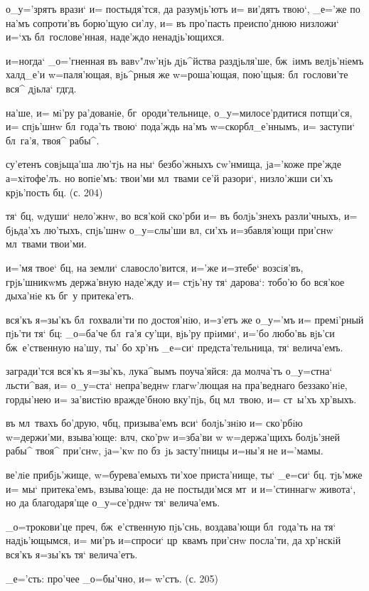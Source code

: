    о_у='зрятъ врази` и= постыдя'тся, да 
разумjь'ютъ и= ви'дятъ твою`, _е='же по на'мъ сопроти'въ 
борю'щую си'лу, и= въ про'пасть преиспо'днюю низложи` 
и=`хъ бл~гослове'нная, наде'ждо ненадjь'ющихся.


  и=ногда` _о='гненная въ 
вавv"лw'нjь дjь^йства раздjьля'ше, бж~iимъ велjь'нiемъ 
халд_е'и w=паля'ющая, вjь^рныя же w=роша'ющая, пою'щыя: 
бл~гослови'те вся^ дjьла` гд гд.

 на'ше, и= мi'ру ра'дованiе, 
бг~ороди'тельнице, о_у=милосе'рдитися потщи'ся, и= 
спjь'шнw бл~года'ть твою` пода'ждь на'мъ 
w=скорбл_е'ннымъ, и= заступи` бл~га'я, твоя^ рабы^.

 су'етенъ совjьща'ша лю'тjь на ны` 
безбо'жныхъ сw'нмища, jа='коже пре'жде а=хiтофе'лъ. но 
вопiе'мъ: твои'ми мл~твами се'й разори`, низло'жши си'хъ 
крjь'пость бц. (с. 204)

  тя` бц, w\т души` 
нело'жнw, во вся'кой ско'рби и= въ болjь'знехъ 
разли'чныхъ, и= бjьда'хъ лю'тыхъ, спjь'шнw о_у=слы'ши 
вл, си'хъ и=збавля'ющи при'снw мл~твами твои'ми.

   и='мя твое` бц, на земли` 
славосло'вится, и='же и=з\ъ тебе` возсiя'въ, грjь'шникwмъ 
держа'вную наде'жду и= стjь'ну тя` дарова`: тобо'ю бо 
вся'кое дыха'нiе къ бг~у притека'етъ.


  вся'къ я=зы'къ 
бл~гохвали'ти по достоя'нiю, и=з'етъ же о_у='мъ 
и= премi'рный пjь'ти тя` бц: _о=ба'че бл~га'я су'щи, 
вjь'ру прiими`, и='бо любо'вь вjь'си бж~е'ственную на'шу, 
ты' бо хр'нъ _е=си` предста'тельница, тя` 
велича'емъ.

 загради'тся вся'къ я=зы'къ, лука^вымъ 
поуча'яйся: да молча'тъ о_у=стна` льсти^вая, и= о_у=ста` 
непра'веднw глагw'лющая на пра'веднаго беззако'нiе, 
горды'нею и= за'вистiю вражде'бною вку'пjь, бц 
мл~твою, и= ст~ы'хъ хр'выхъ.

 въ мл~твахъ бо'друю, ч бц, 
призыва'емъ вси` болjь'знiю и= ско'рбiю w=держи'ми, 
взыва'юще: вл ч, ско'рw и=зба'ви w\т 
w=держа'щихъ болjь'зней рабы^ твоя^ при'снw, jа='кw по 
бз~jь засту'пницы и=ны'я не и='мамы.

  ве'лiе прибjь'жище, 
w=бурева'емыхъ ти'хое приста'нище, ты` _е=си` бц. 
тjь'мже и= мы` притека'емъ, взыва'юще: да не постыди'мся 
мт~и и='стиннагw живота`, но да благодаря'ще о_у=се'рднw 
тя` велича'емъ.

   _о=трокови'це преч, 
бж~е'ственную пjь'снь, воздава'ющи бл~года'ть на тя` 
надjь'ющымся, и= ми'ръ и=спроси` цр~квамъ при'снw 
посла'ти, да хр'нскiй вся'къ я=зы'къ тя` велича'етъ.

  _е='сть:  про'чее 
_о=бы'чно, и= w'стъ. (с. 205)
